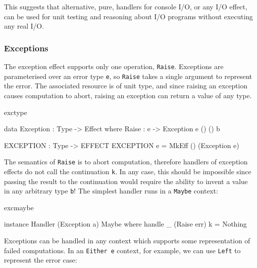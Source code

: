 \noindent


\noindent
This suggests that alternative, pure, handlers for console I/O,
or any I/O effect, can be used for unit testing and reasoning about I/O programs
without executing any real I/O.

\subsubsection{Exceptions}

The exception effect supports only one operation, \texttt{Raise}.
Exceptions are parameterised over an error type \texttt{e}, so \texttt{Raise}
takes a single argument to represent the error. The associated resource is
of unit type, and since raising an exception causes computation to abort, 
raising an exception can return a value of any type.

\begin{SaveVerbatim}{exctype}

data Exception : Type -> Effect where
     Raise : e -> Exception e () () b 

EXCEPTION : Type -> EFFECT
EXCEPTION e = MkEff () (Exception e) 

\end{SaveVerbatim}

\noindent
The semantics of \texttt{Raise} is to abort computation, therefore handlers
of exception effects do not call the continuation \texttt{k}. In any case, 
this should be impossible since passing the result to the continuation would
require the ability to invent a value in any arbitrary type \texttt{b}!
The simplest handler runs in a \texttt{Maybe} context:

\begin{SaveVerbatim}{excmaybe}

instance Handler (Exception a) Maybe where
     handle _ (Raise err) k = Nothing

\end{SaveVerbatim}

\noindent
Exceptions can be handled in any context which supports some representation of
failed computations. In an \texttt{Either e} context, for example, we can
use \texttt{Left} to represent the error case:

